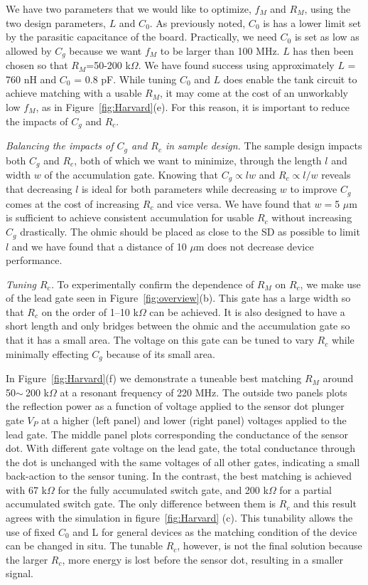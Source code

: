 \documentclass{article}
\begin{document}
We have two parameters that we would like to optimize, $f_M$ and $R_M$, using the two design parameters, $L$ and $C_0$.  As previously noted, $C_0$ is has a lower limit set by the parasitic capacitance of the board.  Practically, we need $C_0$ is set as low as allowed by $C_g$ because we want $f_M$ to be larger than 100 MHz.  $L$ has then been chosen so that $R_M$=50-200 k$\Omega$.  We have found success using approximately $L$ = 760 nH and $C_0$ = 0.8 pF.  While tuning $C_0$ and $L$ does enable the tank circuit to achieve matching with a usable $R_M$, it may come at the cost of an unworkably low $f_M$, as in Figure\ \ref{fig:Harvard}(e).  For this reason, it is important to reduce the impacts of $C_g$ and $R_c$.

\textit{Balancing the impacts of $C_g$ and $R_c$ in sample design.}  The sample design impacts both $C_g$ and $R_c$, both of which we want to minimize, through the length $l$ and width $w$ of the accumulation gate.  Knowing that $C_g\propto lw$ and $R_c\propto l/w$ reveals that decreasing $l$ is ideal for both parameters while decreasing $w$ to improve $C_g$ comes at the cost of increasing $R_c$ and vice versa.  We have found that $w=$5 $\mu$m is sufficient to achieve consistent accumulation for usable $R_c$ without increasing $C_g$ drastically.  The ohmic should be placed as close to the SD as possible to limit $l$ and we have found that a distance of 10 $\mu$m does not decrease device performance.  

\textit{Tuning $R_c$.}  To experimentally confirm the dependence of $R_M$ on $R_c$, we make use of the lead gate seen in Figure\ \ref{fig:overview}(b).  This gate has a large width so that $R_c$ on the order of 1--10 k$\Omega$ can be achieved.  It is also designed to have a short length and only bridges between the ohmic and the accumulation gate so that it has a small area.  The voltage on this gate can be tuned to vary $R_c$ while minimally effecting $C_g$ because of its small area.  

In Figure\ \ref{fig:Harvard}(f) we demonstrate a tuneable best matching $R_M$ around 50$\sim~$200 k$\Omega$ at a resonant frequency of 220 MHz. The outside two panels plots the reflection power as a function of voltage applied to the sensor dot plunger gate $V_{P}$ at a higher (left panel) and lower (right panel) voltages applied to the lead gate. The middle panel plots corresponding the conductance of the sensor dot. With different gate voltage on the lead gate, the total conductance through the dot is unchanged with the same voltages of all other gates, indicating a small back-action to the sensor tuning. In the contrast, the best matching is achieved with 67 k$\Omega$ for the fully accumulated switch gate, and 200 k$\Omega$ for a partial accumulated switch gate. The only difference between them is $R_c$ and this result agrees with the simulation in figure\ \ref{fig:Harvard} (c). This tunability allows the use of fixed $C_0$ and L for general devices as the matching condition of the device can be changed in situ.  The tunable $R_c$, however, is not the final solution because the larger $R_c$, more energy is lost before the sensor dot, resulting in a smaller signal.
\end{document}
